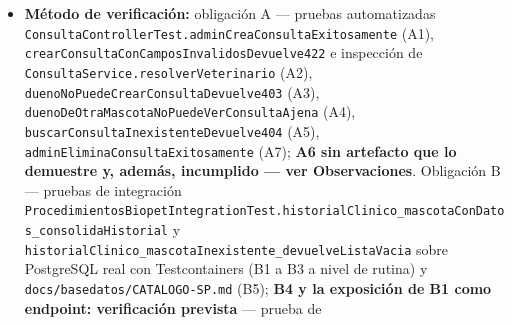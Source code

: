 \documentclass[
  spanish,
]{article}
\begin{document}
\begin{itemize}
\begin{enumerate}
    \textbf{(B2)} Dada una mascota sin eventos clínicos, entonces la
    respuesta es satisfactoria con los conteos en cero, no un error.
  \item
    \textbf{(B3)} Dado un identificador de mascota inexistente, entonces
    el resultado es vacío (a nivel de rutina) o \texttt{404} con
    \texttt{Problem\allowbreak{}Detail} (a nivel de API).
  \item
    \textbf{(B4)} Dado un usuario con rol \texttt{ROLE\_\allowbreak{}DUENO}, cuando
    solicita el historial de una mascota ajena, entonces la respuesta es
    \texttt{403}.
  \item
    \textbf{(B5)} La agregación se implementa como procedimiento
    almacenado versionado en \texttt{db/\allowbreak{}procs/}, no como JPQL con joins
    (ver REQ-NF-013).
  \end{enumerate}
\item
  \textbf{Método de verificación:} obligación A --- pruebas
  automatizadas
  \texttt{Consulta\allowbreak{}Controller\allowbreak{}Test.\allowbreak{}admin\allowbreak{}Crea\allowbreak{}Consulta\allowbreak{}Exitosamente} (A1),
  \texttt{crear\allowbreak{}Consulta\allowbreak{}Con\allowbreak{}Campos\allowbreak{}Invalidos\allowbreak{}Devuelve422} e inspección de
  \texttt{Consulta\allowbreak{}Service.\allowbreak{}resolver\allowbreak{}Veterinario} (A2),
  \texttt{dueno\allowbreak{}No\allowbreak{}Puede\allowbreak{}Crear\allowbreak{}Consulta\allowbreak{}Devuelve403} (A3),
  \texttt{dueno\allowbreak{}De\allowbreak{}Otra\allowbreak{}Mascota\allowbreak{}No\allowbreak{}Puede\allowbreak{}Ver\allowbreak{}Consulta\allowbreak{}Ajena} (A4),
  \texttt{buscar\allowbreak{}Consulta\allowbreak{}Inexistente\allowbreak{}Devuelve404} (A5),
  \texttt{admin\allowbreak{}Elimina\allowbreak{}Consulta\allowbreak{}Exitosamente} (A7); \textbf{A6 sin
  artefacto que lo demuestre y, además, incumplido --- ver
  Observaciones}. Obligación B --- pruebas de integración
  \texttt{Procedimientos\allowbreak{}Biopet\allowbreak{}Integration\allowbreak{}Test.\allowbreak{}historial\allowbreak{}Clinico\_\allowbreak{}mascota\allowbreak{}Con\allowbreak{}Datos\_\allowbreak{}consolida\allowbreak{}Historial}
  y \texttt{historial\allowbreak{}Clinico\_\allowbreak{}mascota\allowbreak{}Inexistente\_\allowbreak{}devue\allowbreak{}lve\allowbreak{}Lista\allowbreak{}Vacia}
  sobre PostgreSQL real con Testcontainers (B1 a B3 a nivel de rutina) y
  \texttt{docs/\allowbreak{}basedatos/\allowbreak{}CATALOGO-\allowbreak{}SP.\allowbreak{}md} (B5); \textbf{B4 y la
  exposición de B1 como endpoint: verificación prevista} --- prueba de

\end{itemize}
\end{document}
